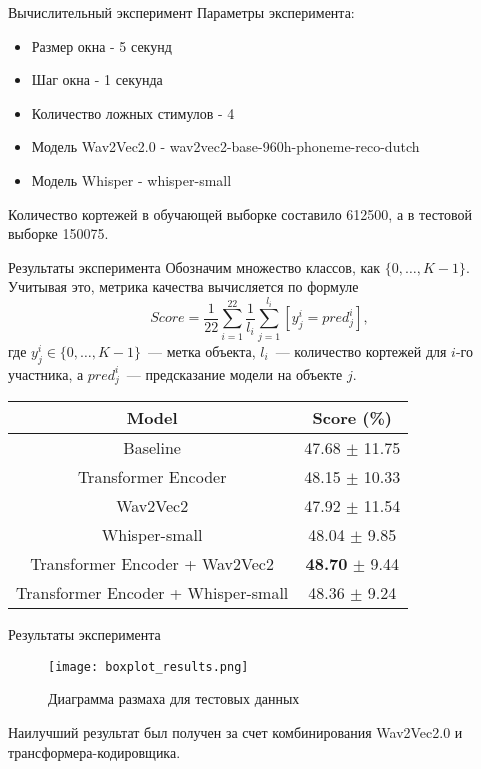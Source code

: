 \documentclass{beamer}
\begin{document}
\begin{frame}{Вычислительный эксперимент}
Параметры эксперимента: 
\begin{itemize}
    \item Размер окна - 5 секунд
    \item Шаг окна - 1 секунда 
    \item Количество ложных стимулов - 4
    \item Модель Wav2Vec2.0 - wav2vec2-base-960h-phoneme-reco-dutch
    \item Модель Whisper - whisper-small
\end{itemize}
Количество кортежей в обучающей выборке составило 612500, а в тестовой выборке 150075.

\end{frame}


\begin{frame}{Результаты эксперимента}
Обозначим множество классов, как $\{0, \dots, K-1\}$. Учитывая это, метрика качества вычисляется по формуле
$$
    Score = \frac{1}{22} \sum_{i=1}^{22} \frac{1}{l_i} \sum_{j=1}^{l_i} \left[ y^i_j = pred^i_j\right],
$$
где $y^i_j \in \{0, \dots, K-1\}$~--- метка объекта, $l_i$~--- количество кортежей для $i$-го участника, а $pred^i_j$~--- предсказание модели на объекте $j$.
\begin{table}[h]
    \centering
    \begin{tabular}{|c|c|} \hline 
        Model & Score (\%) \\ \hline
        Baseline & 47.68 $\pm$ 11.75 \\ 
        Transformer Encoder & 48.15 $\pm$ 10.33 \\ 
        Wav2Vec2 & 47.92 $\pm$ 11.54 \\   
        Whisper-small & 48.04 $\pm$ 9.85 \\   
        Transformer Encoder + Wav2Vec2 & \textbf{48.70} $\pm$ 9.44 \\ 
        Transformer Encoder + Whisper-small & 48.36 $\pm$ 9.24\\ \hline
    \end{tabular}
    \label{results}
\end{table}

\end{frame}

\begin{frame}{Результаты эксперимента}
\begin{figure}
    \centering
    \texttt{[image: boxplot\_results.png]}
    \caption{Диаграмма размаха для тестовых данных}
\end{figure}
Наилучший результат был получен за счет комбинирования Wav2Vec2.0 и трансформера-кодировщика.
\end{frame}
\end{document}
